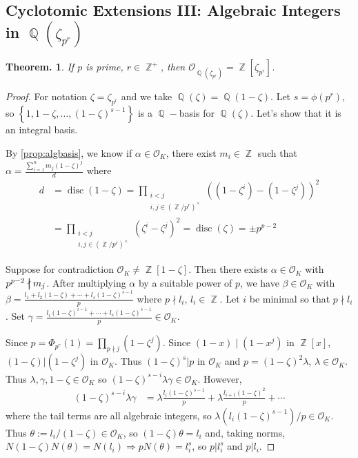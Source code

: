 \documentclass[11pt, a4paper]{memoir}
\DeclareMathOperator{\Q}{{\mathbb{Q}}}
\DeclareMathOperator{\Z}{{\mathbb{Z}}}
\newcommand{\ndiv}{%
    \mathrel{\mkern.5mu %
        \ooalign{\hidewidth$\big|$\hidewidth\cr$\nmid$\cr}%
    }%
}
\theoremstyle{change}
\newtheorem{theorem}{Theorem.}[section]
\theoremstyle{plain}
\theoremstyle{nonumberplain}
\newtheorem{proof}{Proof}
\DeclareMathOperator{\disc}{disc}
\begin{document}
\subsection{Cyclotomic Extensions III: Algebraic Integers in \texorpdfstring{$\Q(\zeta_{p^r})$}{Qzpr}}
\begin{theorem}
    If $p$ is prime, $r\in\Z^+$, then $\mathcal{O}_{\Q(\zeta_{p^r})}=\Z[\zeta_{p^r}]$.
\end{theorem}
\begin{proof}
    For notation $\zeta=\zeta_{p^r}$ and we take $\Q(\zeta)=\Q(1-\zeta)$.
    Let $s=\phi(p^r)$, so $\left\{1,1-\zeta,\ldots,(1-\zeta)^{s-1}\right\}$ is a $\Q-$basis for $\Q(\zeta)$.
    Let's show that it is an integral basis.

    By \cref{prop:algbasis}, we know if $\alpha\in\mathcal{O}_K$, there exist $m_i\in\Z$ such that $\alpha=\frac{\sum_{i=1}^n m_j(1-\zeta)^j}{d}$ where
    \begin{align*}
        d &= \disc(1-\zeta)= \prod_{\substack{i<j\\i,j\in(\Z/p^r)^\times}}((1-\zeta^i)-(1-\zeta^j))^2\\
          &= \prod_{\substack{i<j\\i,j\in(\Z/p^r)^\times}}(\zeta^i-\zeta^j)^2= \disc(\zeta)=\pm p^{p-2}
    \end{align*}

    Suppose for contradiction $\mathcal{O}_K\neq\Z[1-\zeta]$.
    Then there exists $\alpha\in\mathcal{O}_K$ with $p^{p-2}\ndiv m_j$.
    After multiplying $\alpha$ by a suitable power of $p$, we have $\beta\in\mathcal{O}_K$ with $\beta=\frac{l_1+l_2(1-\zeta)+\cdots+l_s(1-\zeta)^{s-1}}{p}$ where $p\nmid l_i$, $l_i\in\Z$.
    Let $i$ be minimal so that $p\nmid l_i$.
    Set $\gamma=\frac{l_i(1-\zeta)^{i-1}+\cdots+l_s(1-\zeta)^{s-1}}{p}\in\mathcal{O}_K$.

    Since $p=\Phi_{p^r}(1)=\prod_{p\nmid j}(1-\zeta^j)$.
    Since $(1-x)\mid(1-x^j)$ in $\Z[x]$, $(1-\zeta)|(1-\zeta^j)$ in $\mathcal{O}_K$.
    Thus $(1-\zeta)^s|p$ in $\mathcal{O}_K$ and $p=(1-\zeta)^2\lambda$, $\lambda\in\mathcal{O}_K$.
    Thus $\lambda,\gamma,1-\zeta\in\mathcal{O}_K$ so $(1-\zeta)^{s-i}\lambda\gamma\in\mathcal{O}_K$.
    However,
    \begin{align*}
        (1-\zeta)^{s-i}\lambda\gamma &= \lambda\frac{l_i(1-\zeta)^{s-1}}{p}+\lambda\frac{l_{i+1}(1-\zeta)^2}{p}+\cdots
    \end{align*}
    where the tail terms are all algebraic integers, so $\lambda(l_i(1-\zeta)^{s-1})/p\in\mathcal{O}_K$.
    Thus $\theta:=l_i/(1-\zeta)\in\mathcal{O}_K$, so $(1-\zeta)\theta=l_i$ and, taking norms, $N(1-\zeta)N(\theta)=N(l_i)\Rightarrow pN(\theta)=l_i^s$, so $p|l_i^s$ and $p|l_i$.
\end{proof}
\end{document}
